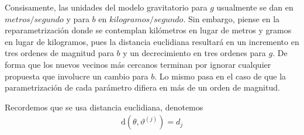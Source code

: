 Consisamente, las unidades del modelo gravitatorio para $g$ usualmente se dan en $metros/segundo$ y para $b$ en $kilogramos/segundo$. Sin embargo, piense en la reparametrización donde se contemplan kilómetros en lugar de metros y gramos en lugar de kilogramos, pues la distancia euclidiana resultará en un incremento en tres ordenes de magnitud para $b$ y un decrecimiento en tres ordenes para $g$. De forma que los nuevos vecinos más cercanos terminan por ignorar cualquier propuesta que involucre un cambio para $b$. Lo mismo pasa en el caso de que la parametrización de cada parámetro difiera en más de un orden de magnitud.


























\newpage

Recordemos que se usa distancia euclidiana, denotemos
\begin{align*}
    \text{d}(\theta, \vartheta^{(j)}) = d_j
\end{align*}







